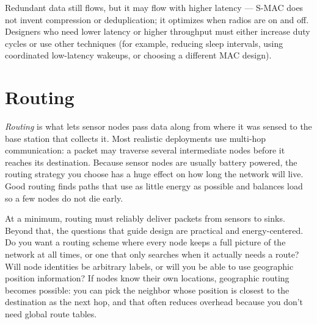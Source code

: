Redundant data still flows, but it may flow with higher latency — S-MAC does not invent compression or deduplication; it optimizes when radios are on and off. Designers who need lower latency or higher throughput must either increase duty cycles or use other techniques (for example, reducing sleep intervals, using coordinated low-latency wakeups, or choosing a different MAC design).

\section{Routing}
\textit{Routing} is what lets sensor nodes pass data along from where it was sensed to the base station that collects it. Most realistic deployments use multi-hop communication: a packet may traverse several intermediate nodes before it reaches its destination. Because sensor nodes are usually battery powered, the routing strategy you choose has a huge effect on how long the network will live. Good routing finds paths that use as little energy as possible and balances load so a few nodes do not die early.

At a minimum, routing must reliably deliver packets from sensors to sinks. Beyond that, the questions that guide design are practical and energy-centered. Do you want a routing scheme where every node keeps a full picture of the network at all times, or one that only searches when it actually needs a route? Will node identities be arbitrary labels, or will you be able to use geographic position information? If nodes know their own locations, geographic routing becomes possible: you can pick the neighbor whose position is closest to the destination as the next hop, and that often reduces overhead because you don’t need global route tables.

